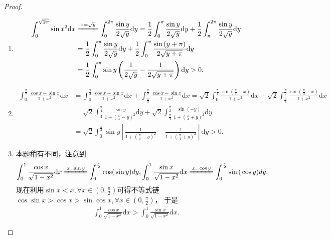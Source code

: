 \documentclass[../../main.tex]{subfiles}
\begin{document}
\begin{proof}
\begin{enumerate}
\item \begin{align*}
\int_0^{\sqrt{2\pi}}{\sin x^2\mathrm{d}x}&\xlongequal{x=\sqrt{y}}\int_0^{2\pi}{\frac{\sin y}{2\sqrt{y}}\mathrm{d}y}=\frac{1}{2}\int_0^{\pi}{\frac{\sin y}{2\sqrt{y}}\mathrm{d}y}+\frac{1}{2}\int_{\pi}^{2\pi}{\frac{\sin y}{2\sqrt{y}}\mathrm{d}y}
\\
&=\frac{1}{2}\int_0^{\pi}{\frac{\sin y}{2\sqrt{y}}\mathrm{d}y}+\frac{1}{2}\int_0^{\pi}{\frac{\sin \left( y+\pi \right)}{2\sqrt{y+\pi}}\mathrm{d}y}
\\
&=\frac{1}{2}\int_0^{\pi}{\sin y\left( \frac{1}{2\sqrt{y}}-\frac{1}{2\sqrt{y+\pi}} \right) \mathrm{d}y}>0.
\end{align*}

\item \begin{align*}
\int_0^{\frac{\pi}{2}}{\frac{\cos x-\sin x}{1+x^2}\mathrm{d}x}&=\int_0^{\frac{\pi}{4}}{\frac{\cos x-\sin x}{1+x^2}\mathrm{d}x}+\int_{\frac{\pi}{4}}^{\frac{\pi}{2}}{\frac{\cos x-\sin x}{1+x^2}\mathrm{d}x}=\sqrt{2}\int_0^{\frac{\pi}{4}}{\frac{\sin \left( \frac{\pi}{4}-x \right)}{1+x^2}\mathrm{d}x}+\sqrt{2}\int_{\frac{\pi}{4}}^{\frac{\pi}{2}}{\frac{\sin \left( \frac{\pi}{4}-x \right)}{1+x^2}\mathrm{d}x}
\\
&=\sqrt{2}\int_0^{\frac{\pi}{4}}{\frac{\sin y}{1+\left( \frac{\pi}{4}-y \right) ^2}\mathrm{d}y}+\sqrt{2}\int_{\frac{\pi}{4}}^{\frac{\pi}{2}}{\frac{\sin \left( -y \right)}{1+\left( \frac{\pi}{4}+y \right) ^2}\mathrm{d}y}
\\
&=\sqrt{2}\int_0^{\frac{\pi}{4}}{\sin y\left[ \frac{1}{1+\left( \frac{\pi}{4}-y \right) ^2}-\frac{1}{1+\left( \frac{\pi}{4}+y \right) ^2} \right] \mathrm{d}y}>0.
\end{align*}

\item 本题稍有不同，注意到
\begin{align*}
\int_0^1{\frac{\cos x}{\sqrt{1-x^2}}\mathrm{d}x\xlongequal{x=\sin y}\int_0^{\frac{\pi}{2}}{\mathrm{cos(}\sin y)dy,\int_0^1{\frac{\sin x}{\sqrt{1-x^2}}\mathrm{d}x\xlongequal{x=\cos y}\int_0^{\frac{\pi}{2}}{\sin\mathrm{(}\cos y)dy}}}}.
\end{align*}
现在利用\(\sin x < x, \forall x \in (0, \frac{\pi}{2})\)可得不等式链
\(\cos\sin x > \cos x > \sin\cos x, \forall x \in (0, \frac{\pi}{2})\)，
于是
\begin{align*}
\int_{0}^{1}\frac{\cos x}{\sqrt{1 - x^{2}}}\mathrm{d}x > \int_{0}^{1}\frac{\sin x}{\sqrt{1 - x^{2}}}\mathrm{d}x.
\end{align*} 
\end{enumerate}
\end{proof}
\end{document}
